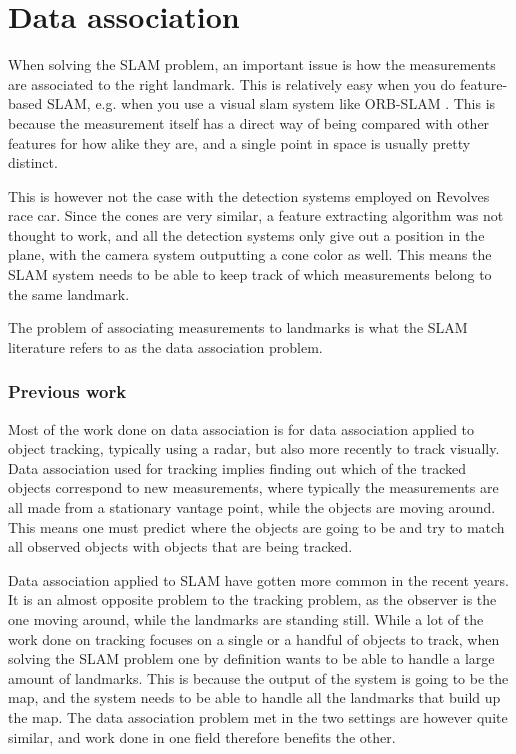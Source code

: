 \section{Data association}

When solving the \gls{SLAM} problem, an important issue is how the measurements are associated to the right landmark. This is relatively easy when you do feature-based \gls{SLAM}, e.g. when you use a visual slam system like ORB-SLAM \cite{ORBSLAM}. This is because the measurement itself has a direct way of being compared with other features for how alike they are, and a single point in space is usually pretty distinct. 

This is however not the case with the detection systems employed on Revolves race car. Since the cones are very similar, a feature extracting algorithm was not thought to work, and all the detection systems only give out a position in the plane, with the camera system outputting a cone color as well. This means the SLAM system needs to be able to keep track of which measurements belong to the same landmark. 

The problem of associating measurements to landmarks is what the SLAM literature refers to as the data association problem.

\subsubsection{Previous work}

Most of the work done on data association is for data association applied to object tracking, typically using a radar\cite{RadarTracking}, but also more recently to track visually\cite{VisualTracking}. Data association used for tracking implies finding out which of the tracked objects correspond to new measurements, where typically the measurements are all made from a stationary vantage point, while the objects are moving around. This means one must predict where the objects are going to be and try to match all observed objects with objects that are being tracked. 

Data association applied to \gls{SLAM} have gotten more common in the recent years. It is an almost opposite problem to the tracking problem, as the observer is the one moving around, while the landmarks are standing still. While a lot of the work done on tracking focuses on a single or a handful of objects to track, when solving the \gls{SLAM} problem one by definition wants to be able to handle a large amount of landmarks. This is because the output of the system is going to be the map, and the system needs to be able to handle all the landmarks that build up the map. The data association problem met in the two settings are however quite similar, and work done in one field therefore benefits the other. 

